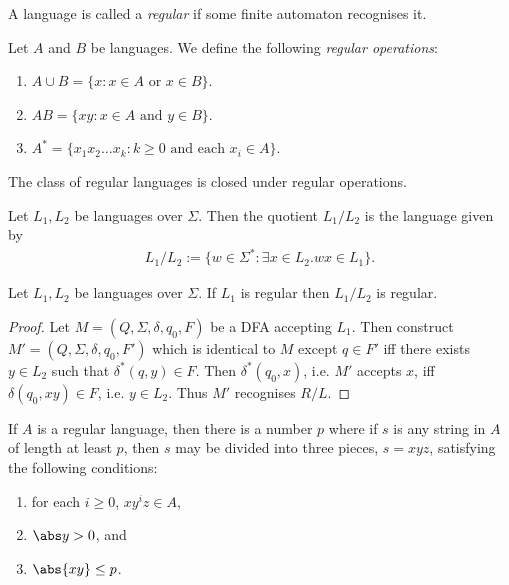 \documentclass{article}
\begin{document}
\begin{definition*}
	A language is called a \emph{regular} if some finite automaton recognises it.
\end{definition*}

\begin{definition*}
	Let $A$ and $B$ be languages. We define the following \emph{regular operations}:
	\begin{enumerate}
		\item $A\cup B=\{x : x \in A \text{ or } x \in B\}$.
		\item $AB=\{xy : x \in A \text{ and } y \in B\}$.
		\item $A^* = \{x_1x_2\dots x_k:k\geq 0 \text{ and each }x_i\in A\}$.
	\end{enumerate}
\end{definition*}

\begin{theorem*}[Sipser p. 45, 60, 62]
	The class of regular languages is closed under regular operations.
\end{theorem*}

\begin{definition*}[Quotient]
	Let $L_1,L_2$ be languages over $\Sigma$. Then the quotient $L_1/L_2$ is the language 
	given by 
	\begin{align*}
		L_1/L_2 := \{w \in \Sigma^* : \exists x\in L_2. wx \in L_1\}.
	\end{align*}
\end{definition*}

\begin{theorem*}
	Let $L_1,L_2$ be languages over $\Sigma$. If $L_1$ is regular then $L_1/L_2$ is regular.
	\begin{proof}
		Let $M=(Q, \Sigma, \delta, q_0, F)$ be a DFA accepting $L_1$. Then construct $M'=(Q,\Sigma,\delta,q_0,F')$
		which is identical to $M$ except $q\in F'$ iff there exists $y\in L_2$ such that 
		$\delta^*(q, y)\in F$.
		Then $\delta^*(q_0, x)$, i.e. $M'$ accepts $x$, iff $\delta(q_0,xy)\in F$, i.e. 
		$y\in L_2$. Thus $M'$ recognises $R/L$.
	\end{proof}
\end{theorem*}

\begin{theorem*}
	If $A$ is a regular language, then there is a number $p$ where if $s$
	is any string in $A$ of length at least $p$, then $s$ may be divided
	into three pieces, $s=xyz$, satisfying the following conditions:
	\begin{enumerate}
		\item for each $i\geq 0$, $xy^iz\in A$,
		\item $\abs y > 0$, and
		\item $\abs{xy} \leq p$.
	\end{enumerate}
\end{theorem*}
\end{document}
